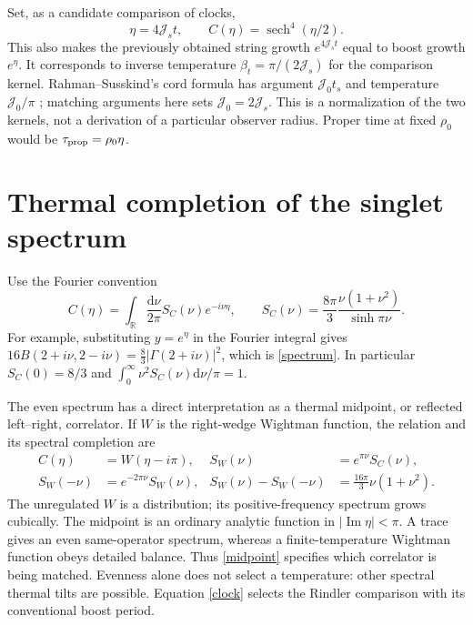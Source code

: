 \documentclass[11pt,a4paper]{article}
\newcommand{\dd}{\mathrm d}
\newcommand{\Js}{\mathcal J_s}
\DeclareMathOperator{\sech}{sech}
\begin{document}
Set, as a candidate comparison of clocks,
\begin{equation}
 \eta=4\Js t,\qquad C(\eta)=\sech^4(\eta/2).\label{clock}
\end{equation}
This also makes the previously obtained string growth $e^{4\Js t}$
equal to boost growth $e^\eta$. It corresponds to inverse temperature
$\beta_t=\pi/(2\Js)$ for the comparison kernel. Rahman--Susskind's cord
formula has argument $\mathcal J_0 t_s$ and temperature
$\mathcal J_0/\pi$ \cite{rs}; matching arguments here sets
$\mathcal J_0=2\Js$. This is a normalization of the two kernels,
not a derivation of a particular observer radius. Proper time at fixed
$\rho_0$ would be $\tau_{\rm prop}=\rho_0\eta$.

\section{Thermal completion of the singlet spectrum}
Use the Fourier convention
\begin{equation}
 C(\eta)=\int_{\mathbb R}\frac{\dd\nu}{2\pi}
 S_C(\nu)e^{-i\nu\eta},\qquad
 S_C(\nu)=\frac{8\pi}{3}\frac{\nu(1+\nu^2)}{\sinh\pi\nu}.\label{spectrum}
\end{equation}
For example, substituting $y=e^\eta$ in the Fourier integral gives
$16B(2+i\nu,2-i\nu)=\frac83|\Gamma(2+i\nu)|^2$, which is
\eqref{spectrum}. In particular $S_C(0)=8/3$ and
$\int_0^\infty \nu^2S_C(\nu)\dd\nu/\pi=1$.

The even spectrum has a direct interpretation as a thermal midpoint,
or reflected left--right, correlator. If $W$ is the right-wedge
Wightman function, the relation and its spectral completion are
\begin{align}
 C(\eta)&=W(\eta-i\pi),&
 S_W(\nu)&=e^{\pi\nu}S_C(\nu),\label{midpoint}\\
 S_W(-\nu)&=e^{-2\pi\nu}S_W(\nu),&
 S_W(\nu)-S_W(-\nu)&=\frac{16\pi}{3}\nu(1+\nu^2).
\end{align}
The unregulated $W$ is a distribution; its positive-frequency spectrum
grows cubically. The midpoint is an ordinary analytic function in
$|\operatorname{Im}\eta|<\pi$. A trace gives an even same-operator
spectrum, whereas a finite-temperature Wightman function obeys detailed
balance. Thus \eqref{midpoint} specifies which correlator is being matched.
Evenness alone does not select a temperature: other spectral thermal
tilts are possible. Equation \eqref{clock} selects the Rindler comparison
with its conventional boost period.
\end{document}
